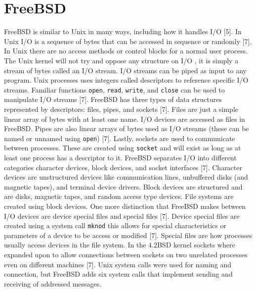\documentclass[letterpaper,10pt,titlepage,draftclsnofoot,onecolumn]{IEEEtran}
\begin{document}
\section{FreeBSD}
FreeBSD is similar to Unix in many ways, including how it handles I/O [5]. In Unix I/O is a sequence of bytes that can be accessed in sequence or randomly [7]. In Unix there are no access methods or control blocks for a normal user process. The Unix kernel will not try and oppose any structure on I/O , it is simply a stream of bytes called an I/O stream. I/O streams can be piped as input to any program. Unix processes uses integers called descriptors to reference specific I/O streams. Familiar functions \texttt{open}, \texttt{read}, \texttt{write}, and \texttt{close} can be used to manipulate I/O streams [7]. FreeBSD has three types of data structures represented by descriptors: files, pipes, and sockets [7]. Files are just a simple linear array of bytes with at least one name. I/O devices are accessed as files in FreeBSD. Pipes are also linear arrays of bytes used as I/O streams (these can be named or unnamed using \texttt{open}) [7]. Lastly, sockets are used to communicate between processes. These are created using \texttt{socket} and will exist as long as at least one process has a descriptor to it. FreeBSD separates I/O into different categories character devices, block devices, and socket interfaces [7]. Character devices are unstructured devices like communication lines, unbuffered disks (and magnetic tapes), and terminal device drivers. Block devices are structured and are disks, magnetic tapes, and random access type devices. File systems are created using block devices. One more distinction that FreeBSD makes between I/O devices are device special files and special files [7]. Device special files are created using a system call \texttt{mknod} this allows for special characteristics or parameters of a device to be access or modified [7]. Special files are how processes usually access devices in the file system. In the 4.2BSD kernel sockets where expanded upon to allow connections between sockets on two unrelated processes even on different machines [7]. Unix system calls were used for naming and connection, but FreeBSD adds six system calls that implement sending and receiving of addressed messages. 
\end{document}
